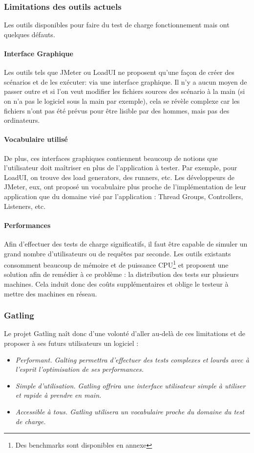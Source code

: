 \subsubsection{Limitations des outils actuels}
Les outils disponibles pour faire du test de charge fonctionnement mais ont quelques défauts.
\paragraph{Interface Graphique}
Les outils tels que JMeter ou LoadUI ne proposent qu'une façon de créer des scénarios et de les exécuter: via une interface graphique. Il n'y a aucun moyen de passer outre et si l'on veut modifier les fichiers sources des scénario à la main (si on n'a pas le logiciel sous la main par exemple), cela se révèle complexe car les fichiers n'ont pas été prévus pour être lisible par des hommes, mais pas des ordinateurs.

\paragraph{Vocabulaire utilisé}
De plus, ces interfaces graphiques contiennent beaucoup de notions que l'utilisateur doit maîtriser en plus de l'application à tester. Par exemple, pour LoadUI, on trouve des load generators, des runners, etc. Les développeurs de JMeter, eux, ont proposé un vocabulaire plus proche de l'implémentation de leur application que du domaine visé par l'application : Thread Groups, Controllers, Listeners, etc.

\paragraph{Performances}
Afin d'effectuer des tests de charge significatifs, il faut être capable de simuler un grand nombre d'utilisateurs ou de requêtes par seconde. Les outils existants consomment beaucoup de mémoire et de puissance CPU\footnote{Des benchmarks sont disponibles en annexe} et proposent une solution afin de remédier à ce problème : la distribution des tests sur plusieurs machines. Cela induit donc des coûts supplémentaires et oblige le testeur à mettre des machines en réseau.

\subsubsection{Gatling}
Le projet Gatling naît donc d'une volonté d'aller au-delà de ces limitations et de proposer à ses futurs utilisateurs un logiciel :
\begin{itemize}
  \item \em{Performant}. Galting permettra d'effectuer des tests complexes et lourds avec à l'esprit l'optimisation de ses performances.
  \item \em{Simple d'utilisation}. Gatling offrira une interface utilisateur simple à utiliser et rapide à prendre en main.
  \item \em{Accessible à tous}. Gatling utilisera un vocabulaire proche du domaine du test de charge.
\end{itemize}